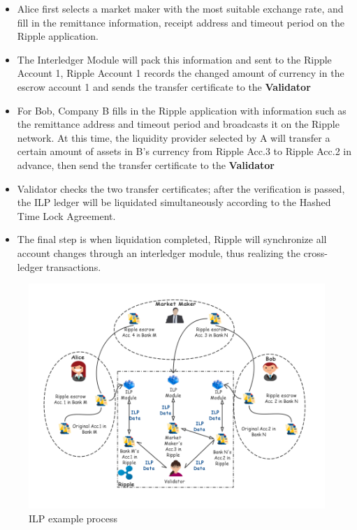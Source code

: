 \begin{itemize}
    \item Alice first selects a market maker with the most suitable exchange rate, and fill in the remittance information, receipt address and timeout period on the Ripple application.
    \item The Interledger Module will pack this information and sent to the Ripple Account 1, Ripple Account 1 records the changed amount of currency in the escrow account 1 and sends the transfer certificate to the \textbf{Validator}
    \item For Bob, Company B fills in the Ripple application with information such as the remittance address and timeout period and broadcasts it on the Ripple network. At this time, the liquidity provider selected by A will transfer a certain amount of assets in B's currency from Ripple Acc.3 to Ripple Acc.2 in advance, then send the transfer certificate to the \textbf{Validator}
    \item Validator checks the two transfer certificates; after the verification is passed, the ILP ledger will be liquidated simultaneously according to the Hashed Time Lock Agreement.
    \item The final step is when liquidation completed, Ripple will synchronize all account changes through an interledger module, thus realizing the cross-ledger transactions.
\end{itemize}
        \begin{figure}[H]
        \includegraphics[width=1\textwidth]{./figures/ILP.png}
        \centering
        \caption{ILP example process}%
        \centering
        \label{fig:ILP}
        \end{figure}
        

